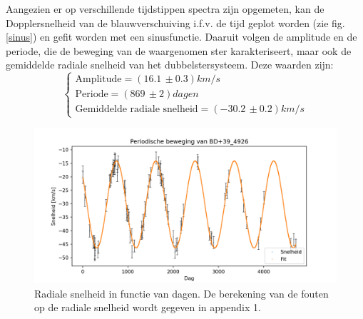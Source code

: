 \documentclass[12pt]{article}
\begin{document}
	\noindent
	Aangezien er op verschillende tijdstippen spectra zijn opgemeten, kan de Dopplersnelheid van de blauwverschuiving i.f.v. de tijd geplot worden (zie fig. \ref{sinus}) en gefit worden met een sinusfunctie. Daaruit volgen de amplitude en de periode, die de beweging van de waargenomen ster karakteriseert, maar ook de gemiddelde radiale snelheid van het dubbelstersysteem. Deze waarden zijn: 
	\begin{equation}
		\begin{cases}
			\text{Amplitude}=(16.1\,\pm0.3)km/s\\
			\text{Periode}=(869\,\pm2)dagen\\
			\text{Gemiddelde radiale snelheid}=(-30.2\,\pm0.2)km/s
		\end{cases}
	\end{equation}

	\begin{figure}[h]\label{sinus}
	   	\centering
	    	\includegraphics[width=1\textwidth]{snelheid per dag.png}
	    	\caption{Radiale snelheid in functie van dagen. De berekening van de fouten op de radiale snelheid wordt gegeven in appendix 1.}
	    	\label{fig 4:snelheid per dag}
	\end{figure}
	
\end{document}

